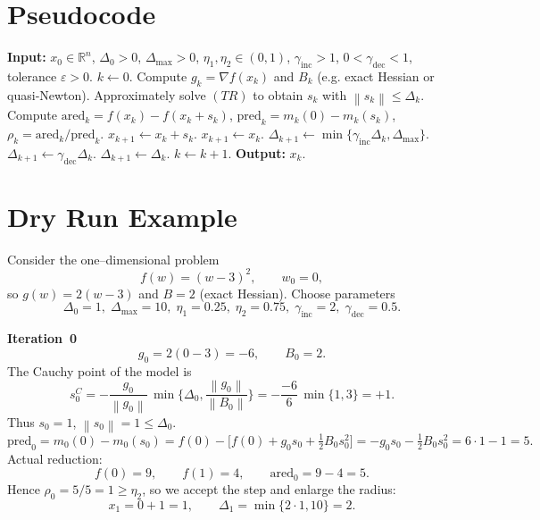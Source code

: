 \documentclass{article}
\newcommand{\norm}[1]{\left\lVert #1\right\rVert}
\newcommand{\R}{\mathbb{R}}
\begin{document}
\section*{Pseudocode}
\begin{algorithm}[H]
\caption{Trust Region Method}
\begin{algorithmic}[1]
\State \textbf{Input:} $x_0\in\R^n$, $\Delta_0>0$, $\Delta_{\max}>0$,
$\eta_1,\eta_2\in(0,1)$, $\gamma_{\text{inc}}>1$, $0<\gamma_{\text{dec}}<1$,
tolerance $\varepsilon>0$.
\State $k\gets 0$.
\While{$\norm{\nabla f(x_k)}>\varepsilon$}
    \State Compute $g_k=\nabla f(x_k)$ and $B_k$ (e.g. exact Hessian or quasi‑Newton).
    \State Approximately solve $(TR)$ to obtain $s_k$ with $\norm{s_k}\le\Delta_k$.
    \State Compute $\text{ared}_k = f(x_k)-f(x_k+s_k)$,
          $\text{pred}_k = m_k(0)-m_k(s_k)$,
          $\rho_k = \text{ared}_k/\text{pred}_k$.
        \State $x_{k+1}\gets x_k+s_k$.
    \Else
        \State $x_{k+1}\gets x_k$.
    \EndIf
        \State $\Delta_{k+1}\gets \min\{\gamma_{\text{inc}}\Delta_k,\Delta_{\max}\}$.
        \State $\Delta_{k+1}\gets \gamma_{\text{dec}}\Delta_k$.
    \Else
        \State $\Delta_{k+1}\gets \Delta_k$.
    \EndIf
    \State $k\gets k+1$.
\EndWhile
\State \textbf{Output:} $x_k$.
\end{algorithmic}
\end{algorithm}

\section*{Dry Run Example}
Consider the one–dimensional problem
\[
f(w)=(w-3)^2,\qquad w_0=0,
\]
so $g(w)=2(w-3)$ and $B=2$ (exact Hessian).  
Choose parameters
\[
\Delta_0=1,\; \Delta_{\max}=10,\;
\eta_1=0.25,\; \eta_2=0.75,\;
\gamma_{\text{inc}}=2,\;\gamma_{\text{dec}}=0.5.
\]

\noindent\textbf{Iteration~0}\\
\[
g_0 = 2(0-3)=-6,\qquad B_0=2.
\]
The Cauchy point of the model is
\[
s_0^{C}= -\frac{g_0}{\norm{g_0}}\,\min\!\Big\{\Delta_0,\frac{\norm{g_0}}{\norm{B_0}}\Big\}
      = -\frac{-6}{6}\,\min\{1,3\}=+1 .
\]
Thus $s_0=1$, $\norm{s_0}=1\le\Delta_0$.
\[
\text{pred}_0 = m_0(0)-m_0(s_0)
 = f(0)-\big[f(0)+g_0 s_0+\tfrac12 B_0 s_0^2\big]
 = -g_0 s_0-\tfrac12 B_0 s_0^2 = 6\cdot1-1 =5 .
\]
Actual reduction:
\[
f(0)=9,\qquad f(1)=4,\qquad 
\text{ared}_0 = 9-4 =5 .
\]
Hence $\rho_0=5/5=1\ge\eta_2$, so we accept the step and enlarge the radius:
\[
x_1 = 0+1 = 1,\qquad 
\Delta_1 = \min\{2\cdot1,10\}=2 .
\]
\end{document}
